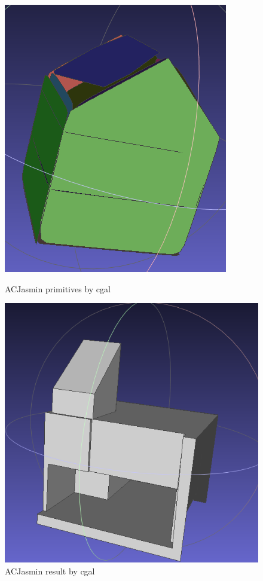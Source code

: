 \documentclass{article}
\begin{document}
\begin{figure}[H]
\begin{minipage}[t]{0.29\textwidth}
    \includegraphics[width=\textwidth]{../../images/screen_kinetic/ACJasmin_primitive_cgal.png}
    \caption*{ACJasmin primitives by cgal}
  \end{minipage}
  \begin{minipage}[t]{0.27\textwidth}
    \includegraphics[width=\textwidth]{../../images/screen_kinetic/ACJasmin_result_CGAL.png}
    \caption*{ACJasmin result by cgal}
  \end{minipage}
\end{figure}  
\end{document}
